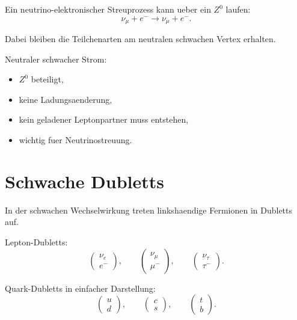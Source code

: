 \begin{examplebox}
Ein neutrino-elektronischer Streuprozess kann ueber ein $Z^0$ laufen:
\[
    \nu_\mu + e^- \rightarrow \nu_\mu + e^-.
\]

Dabei bleiben die Teilchenarten am neutralen schwachen Vertex erhalten.
\end{examplebox}

\begin{examtipbox}
Neutraler schwacher Strom:
\begin{itemize}
    \item $Z^0$ beteiligt,
    \item keine Ladungsaenderung,
    \item kein geladener Leptonpartner muss entstehen,
    \item wichtig fuer Neutrinostreuung.
\end{itemize}
\end{examtipbox}

\section{Schwache Dubletts}

In der schwachen Wechselwirkung treten linkshaendige Fermionen in Dubletts auf.

\begin{conceptbox}
Lepton-Dubletts:
\[
    \begin{pmatrix}
        \nu_e \\
        e^-
    \end{pmatrix},
    \qquad
    \begin{pmatrix}
        \nu_\mu \\
        \mu^-
    \end{pmatrix},
    \qquad
    \begin{pmatrix}
        \nu_\tau \\
        \tau^-
    \end{pmatrix}.
\]
\end{conceptbox}

\begin{conceptbox}
Quark-Dubletts in einfacher Darstellung:
\[
    \begin{pmatrix}
        u \\
        d
    \end{pmatrix},
    \qquad
    \begin{pmatrix}
        c \\
        s
    \end{pmatrix},
    \qquad
    \begin{pmatrix}
        t \\
        b
    \end{pmatrix}.
\]
\end{conceptbox}

